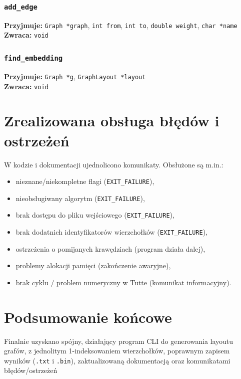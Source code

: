 \documentclass[12pt]{article}
\begin{document}
\subsubsection{\texttt{add\_edge}}
\textbf{Przyjmuje:} \texttt{Graph *graph}, \texttt{int from}, \texttt{int to}, \texttt{double weight}, \texttt{char *name}\\
\textbf{Zwraca:} \texttt{void}

\subsubsection{\texttt{find\_embedding}}
\textbf{Przyjmuje:} \texttt{Graph *g}, \texttt{GraphLayout *layout}\\
\textbf{Zwraca:} \texttt{void}

\section{Zrealizowana obsługa błędów i ostrzeżeń}
W kodzie i dokumentacji ujednolicono komunikaty. Obsłużone są m.in.:
\begin{itemize}
	\item nieznane/niekompletne flagi (\texttt{EXIT\_FAILURE}),
	\item nieobsługiwany algorytm (\texttt{EXIT\_FAILURE}),
	\item brak dostępu do pliku wejściowego (\texttt{EXIT\_FAILURE}),
	\item brak dodatnich identyfikatorów wierzchołków (\texttt{EXIT\_FAILURE}),
	\item ostrzeżenia o pomijanych krawędziach (program działa dalej),
	\item problemy alokacji pamięci (zakończenie awaryjne),
	\item brak cyklu / problem numeryczny w Tutte (komunikat informacyjny).
\end{itemize}

\section{Podsumowanie końcowe}
Finalnie uzyskano spójny, działający program CLI do generowania layoutu grafów,
z jednolitym 1-indeksowaniem wierzchołków, poprawnym zapisem wyników
(\texttt{.txt} i \texttt{.bin}), zaktualizowaną dokumentacją oraz
komunikatami błędów/ostrzeżeń
\end{document}
